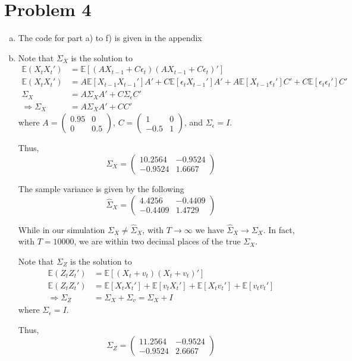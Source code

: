 \documentclass[12pt]{article}
\theoremstyle{definition}
\newcommand\E{\mathbb{E}}
\newcommand{\pa}[1]{\left(#1\right)}
\newcommand{\mat}[1]{\begin{matrix}#1\end{matrix}}
\newcommand{\pmat}[1]{\pa{\mat{#1}}}
\begin{document}
\section*{Problem 4}
\begin{enumerate}[(a)]
	\item
	
	The code for part a) to f) is given in the appendix
	
	\item
	
			Note that $\Sigma_X$ is the solution to
	\begin{align*}
	\E(X_tX_t') &= \E\left[ (AX_{t-1}+C\epsilon_t)(AX_{t-1}+C\epsilon_t)'\right]\\ 
	\E(X_tX_t') &= A\E\left[ X_{t-1}X_{t-1}'\right]A'+ C\E\left[\epsilon_{t} X_{t-1}'\right]A' + A\E\left[ X_{t-1}\epsilon_{t}'\right]C'+ C\E\left[ \epsilon_{t}\epsilon_{t}'\right]C'\\ 
	\Sigma_X &= A\Sigma_X A'+C\Sigma_{\epsilon}C'\\ 
	\Rightarrow	\Sigma_X&=A \Sigma_X A'+ CC'
	\end{align*}
	where $A=\pmat{0.95& 0\\ 0 & 0.5}$, $C=\pmat{1& 0\\ -0.5 & 1}$, and $\Sigma_\epsilon = I$.
	
	Thus,
	\[
	\Sigma_X = \pmat{10.2564  & -0.9524\\
	-0.9524  &  1.6667}
	\]
	
	The sample variance is given by the following
	\[
	\hat{\Sigma}_X = \pmat{4.4256  & -0.4409\\
		-0.4409   & 1.4729}
	\]
	
	While in our simulation $\Sigma_X \neq \hat{\Sigma}_X$, with $T\to \infty$ we have $\hat{\Sigma}_X \to \Sigma_X $. In fact, with $T=10000$, we are within two decimal places of the true $\Sigma_X$.
	
	Note that $\Sigma_Z$ is the solution to
	\begin{align*}
	\E(Z_tZ_t') &= \E\left[ (X_{t}+ v_t)(X_{t}+v_t)'\right]\\ 
	\E(Z_tZ_t') &= \E\left[ X_{t}X_{t}'\right]+ \E\left[v_{t} X_{t}'\right] + \E\left[ X_{t}v_{t}'\right]+ \E\left[ v_{t}v_{t}'\right]\\ 
	\Rightarrow	 \Sigma_Z &= \Sigma_X+\Sigma_{v} = \Sigma_X + I
	\end{align*}
	where $\Sigma_\epsilon = I$.
	
	Thus,
	\[\Sigma_Z= \pmat{11.2564   &-0.9524\\
	-0.9524  &  2.6667}\]
	

\end{enumerate}
\end{document}
